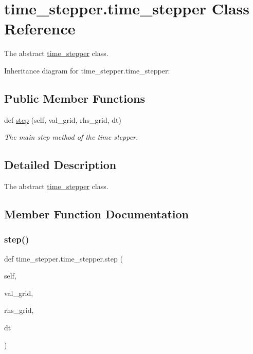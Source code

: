 \hypertarget{classtime__stepper_1_1time__stepper}{}\section{time\+\_\+stepper.\+time\+\_\+stepper Class Reference}
\label{classtime__stepper_1_1time__stepper}


The abstract \hyperlink{classtime__stepper_1_1time__stepper}{time\+\_\+stepper} class.  




Inheritance diagram for time\+\_\+stepper.\+time\+\_\+stepper\+:
\subsection*{Public Member Functions}
\begin{DoxyCompactItemize}
\item 
def \hyperlink{classtime__stepper_1_1time__stepper_a874974dcfa5f9b51de6598c7e1cd3b6a}{step} (self, val\+\_\+grid, rhs\+\_\+grid, dt)
\begin{DoxyCompactList}\small\item\em The main step method of the time stepper. \end{DoxyCompactList}\end{DoxyCompactItemize}


\subsection{Detailed Description}
The abstract \hyperlink{classtime__stepper_1_1time__stepper}{time\+\_\+stepper} class. 

\subsection{Member Function Documentation}
\mbox{\label{classtime__stepper_1_1time__stepper_a874974dcfa5f9b51de6598c7e1cd3b6a}} 
\subsubsection{\texorpdfstring{step()}{step()}}
{\footnotesize\ttfamily def time\+\_\+stepper.\+time\+\_\+stepper.\+step (\begin{DoxyParamCaption}\item[{}]{self,  }\item[{}]{val\+\_\+grid,  }\item[{}]{rhs\+\_\+grid,  }\item[{}]{dt }\end{DoxyParamCaption})}



